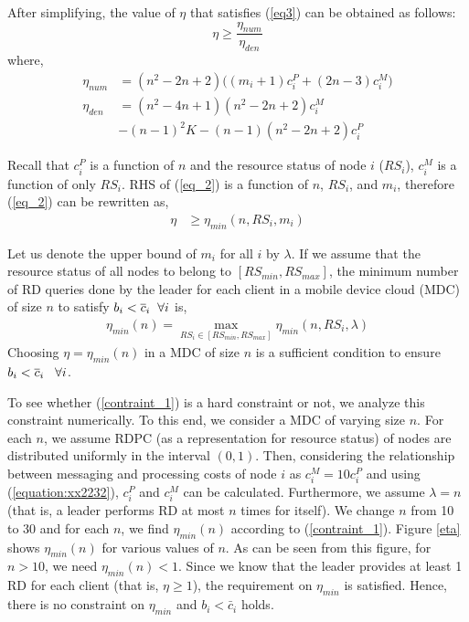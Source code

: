 \documentclass[journal,12pt, onecolumn]{IEEEtran}
\begin{document}
After simplifying, the value of $\eta$ that satisfies (\ref{eq3}) can be obtained as follows:
 \begin{equation}  
\label{eq_2}
\eta \geq \dfrac{\eta_{num}}{\eta_{den}}
\end{equation}
where,
\begin{align*}
\eta_{num} &= (n^2 -2n +2) \Big((m_i +1)c_i ^{P} + (2n-3)c_i ^{M}\Big)
\\
\eta_{den} &= (n^2 -4n+1)(n^2 -2n +2)c_i ^M
\\
& - (n-1)^2 K -(n-1)(n^2 -2n +2)c_i ^{P}
\end{align*}

Recall that $c_i^{P}$ is a function of $n$ and the resource status of node $i$ ($RS_i$), $c_i^{M}$ is a function of only $RS_i$. RHS of (\ref{eq_2}) is a function of $n$, $RS_i$, and $m_i$, therefore (\ref{eq_2}) can be rewritten as, 
\begin{align} 
\label{eq_4}
\eta &\geq \eta_{min} (n,RS_i,m_i)  
\end{align} 

Let us denote the upper bound of $m_i$ for all $i$ by $\lambda$. If we assume that the resource status of all nodes to belong to $[RS_{min}, RS_{max}]$, the minimum number of RD queries done by the leader for each client in a mobile device cloud (MDC) of size $n$ to satisfy $b_i < \overline{c}_i \hspace{2mm} \forall i$ is,
\begin{align}
\label{contraint_1}
\eta_{min}(n)=\max_{RS_i\in [RS_{min}, RS_{max}]}\eta_{min}(n,RS_i,\lambda) 
\end{align}
Choosing $\eta=\eta_{min}(n)$ in a MDC of size $n$ is a sufficient condition to ensure  $b_i < \overline{c}_i \hspace{3mm} \forall i$.  

To see whether (\ref{contraint_1}) is a hard constraint or not, we analyze this constraint numerically. To this end, we consider a MDC of varying size $n$. For each $n$, we assume RDPC (as a representation for resource status) of nodes are distributed uniformly in the interval $(0,1)$. Then, considering the relationship between messaging and processing costs of node $i$ as $c_i ^M = 10 c_i ^P$ and using (\ref{equation:xx2232}), $c_i ^P$ and $c_i ^M$ can be calculated. Furthermore, we assume $\lambda = n$ (that is, a leader performs RD at most $n$ times for itself). We change $n$ from 10 to 30 and for each $n$, we find $\eta_{min}(n)$ according to (\ref{contraint_1}). Figure \ref{eta} shows $\eta_{min}(n)$ for various values of $n$. As can be seen from this figure, for $n>10$, we need $\eta_{min}(n) <1$. Since we know that the leader provides at least 1 RD for each client (that is, $\eta \geq 1$), the requirement on $\eta_{min}$ is satisfied. Hence, there is no constraint on $\eta_{min}$ and $b_i < \bar{c}_i$ holds.
\end{document}
